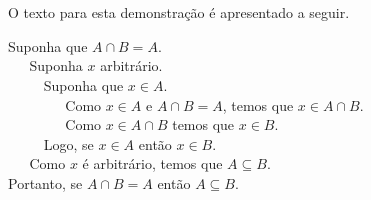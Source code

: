 \begin{Example}
O texto para esta demonstração é apresentado a seguir.

\begin{flushleft}
Suponha que $A\cap B = A$.\\
\verb|   |Suponha $x$ arbitrário.\\
\verb|     |Suponha que $x\in A$.\\
\verb|        |Como $x\in A$ e $A\cap B = A$, temos que $x\in A\cap
B$.\\
\verb|        |Como $x\in A\cap B$ temos que $x\in B$.\\
\verb|     |Logo, se $x\in A$ então $x\in B$.\\
\verb|   |Como $x$ é arbitrário, temos que $A\subseteq B$.\\
Portanto, se $A\cap B = A$ então $A\subseteq B$.
\end{flushleft}
\end{Example}

